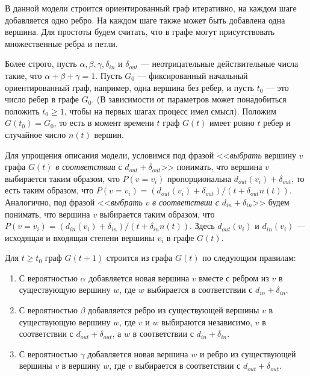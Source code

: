 \documentclass[14pt]{extreport}
\begin{document}
В данной модели\cite{book3} строится ориентированный граф итеративно, на каждом шаге добавляется одно ребро. На каждом шаге также может быть добавлена одна вершина. Для простоты будем считать, что в графе могут присутствовать множественные ребра и петли.

Более строго, пусть $\alpha, \beta, \gamma, \delta_{in}$ и $\delta_{out}$ --- неотрицательные действительные числа такие, что $\alpha + \beta + \gamma = 1$. Пусть $G_0$ --- фиксированный начальный ориентированный граф, например, одна вершина без ребер, и пусть $t_0$ --- это число ребер в графе $G_0$. (В зависимости от параметров может понадобиться положить $t_0 \geqslant 1$, чтобы на первых шагах процесс имел смысл). Положим $G(t_0) = G_0$, то есть в момент времени $t$ граф $G(t)$ имеет ровно $t$ ребер и случайное число $n(t)$ вершин.

Для упрощения описания модели, условимся под фразой <<{\it выбрать} вершину $v$ графа $G(t)$ {\it в соответствии} с $d_{out} + \delta_{out}$>> понимать, что вершина $v$ выбирается таким образом, что $P(v=v_i)$ пропорциональна $d_{out}(v_i) + \delta_{out}$, то есть таким образом, что $P(v=v_i)=(d_{out}(v_i) + \delta_{out})/(t  + \delta_{out}n(t))$. Аналогично, под фразой <<{\it выбрать} $v$ {\it в соответствии с} $d_{in} + \delta_{in}$>> будем понимать, что вершина $v$ выбирается таким образом, что $P(v=v_i)=(d_{in}(v_i) + \delta_{in})/(t  + \delta_{in}n(t))$. Здесь $d_{out}(v_i)$ и $d_{in}(v_i)$ --- исходящая и входящая степени вершины $v_i$ в графе $G(t)$.

Для $t \geqslant t_0$ граф $G(t+1)$ строится из графа $G(t)$ по следующим правилам:
\begin{enumerate}
\item С вероятностью $\alpha$ добавляется новая вершина $v$ вместе с ребром из $v$ в существующую вершину $w$, где $w$ выбирается в соответствии с $d_{in} + \delta_{in}$.
\item С вероятностью $\beta$ добавляется ребро из существующей вершины $v$ в существующую вершину $w$, где $v$ и $w$ выбираются независимо, $v$ в соответствии с $d_{out} + \delta_{out}$, а $w$ в соответствии с $d_{in} + \delta_{in}$.
\item С вероятностью $\gamma$ добавляется новая вершина $w$ и ребро из существующей вершины $v$ в вершину $w$, где $v$ выбирается в соответствии с $d_{out} + \delta_{out}$.
\end{enumerate}
\end{document}
